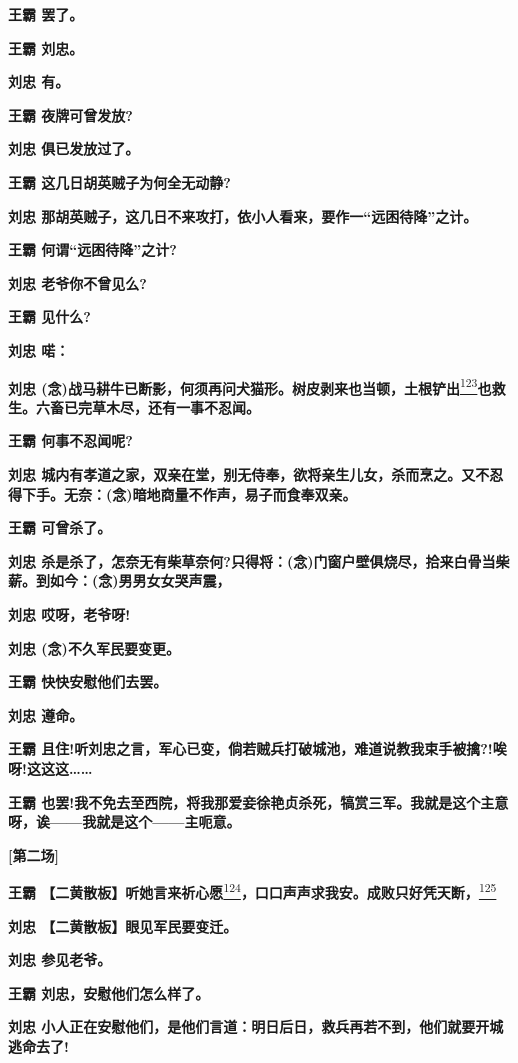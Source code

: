 \textbf{王霸 罢了。}

\textbf{王霸 刘忠。}

\textbf{刘忠 有。}

\textbf{王霸 夜牌可曾发放?}

\textbf{刘忠 俱已发放过了。}

\textbf{王霸 这几日胡英贼子为何全无动静?}

\textbf{刘忠
那胡英贼子，这几日不来攻打，依小人看来，要作一``远困待降''之计。}

\textbf{王霸 何谓``远困待降''之计?}

\textbf{刘忠 老爷你不曾见么?}

\textbf{王霸 见什么?}

\textbf{刘忠 喏：}

\textbf{刘忠
(念)战马耕牛已断影，何须再问犬猫形。树皮剥来也当顿，土根铲出}\protect\hyperlink{fn123}{\textsuperscript{123}}\textbf{也救生。六畜已完草木尽，还有一事不忍闻。}

\textbf{王霸 何事不忍闻呢?}

\textbf{刘忠
城内有孝道之家，双亲在堂，别无侍奉，欲将亲生儿女，杀而烹之。又不忍得下手。无奈：(念)暗地商量不作声，易子而食奉双亲。}

\textbf{王霸 可曾杀了。}

\textbf{刘忠
杀是杀了，怎奈无有柴草奈何?只得将：(念)门窗户壁俱烧尽，拾来白骨当柴薪。到如今：(念)男男女女哭声震，}

\textbf{刘忠 哎呀，老爷呀!}

\textbf{刘忠 (念)不久军民要变更。}

\textbf{王霸 快快安慰他们去罢。}

\textbf{刘忠 遵命。}

\textbf{王霸
且住!听刘忠之言，军心已变，倘若贼兵打破城池，难道说教我束手被擒?!唉呀!这这这\ldots{}\ldots{}}

\textbf{王霸
也罢!我不免去至西院，将我那爱妾徐艳贞杀死，犒赏三军。我就是这个主意呀，诶------我就是这个------主呃意。}

\textbf{{[}第二场{]}}

\textbf{王霸
【二黄散板】听她言来祈心愿}\protect\hyperlink{fn124}{\textsuperscript{124}}\textbf{，口口声声求我安。成败只好凭天断，}\protect\hyperlink{fn125}{\textsuperscript{125}}

\textbf{刘忠 【二黄散板】眼见军民要变迁。}

\textbf{刘忠 参见老爷。}

\textbf{王霸 刘忠，安慰他们怎么样了。}

\textbf{刘忠
小人正在安慰他们，是他们言道：明日后日，救兵再若不到，他们就要开城逃命去了!}

